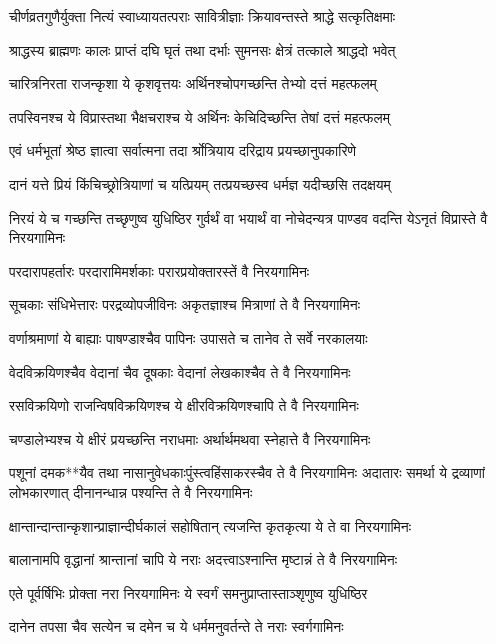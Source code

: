 \twolineshloka
{चीर्णव्रतगुणैर्युक्ता नित्यं स्वाध्यायतत्पराः}
{सावित्रीज्ञाः क्रियावन्तस्ते श्राद्धे सत्कृतिक्षमाः}


\twolineshloka
{श्राद्धस्य ब्राह्मणः कालः प्राप्तं दघि घृतं तथा}
{दर्भाः सुमनसः क्षेत्रं तत्काले श्राद्धदो भवेत्}


\twolineshloka
{चारित्रनिरता राजन्कृशा ये कृशवृत्तयः}
{अर्थिनश्चोपगच्छन्ति तेभ्यो दत्तं महत्फलम्}


\twolineshloka
{तपस्विनश्च ये विप्रास्तथा भैक्षचराश्च ये}
{अर्थिनः केचिदिच्छन्ति तेषां दत्तं महत्फलम्}


\twolineshloka
{एवं धर्मभूतां श्रेष्ठ ज्ञात्वा सर्वात्मना तदा}
{र्श्रोत्रियाय दरिद्राय प्रयच्छानुपकारिणे}


\twolineshloka
{दानं यत्ते प्रियं किंचिच्छ्रोत्रियाणां च यत्प्रियम्}
{तत्प्रयच्छस्व धर्मज्ञ यदीच्छसि तदक्षयम्}


निरयं ये च गच्छन्ति तच्छृणुष्व युधिष्ठिर
\twolineshloka
{गुर्वर्थं वा भयार्थं वा नोचेदन्यत्र पाण्डव}
{वदन्ति येऽनृतं विप्रास्ते वै निरयगामिनः}


\twolineshloka
{परदारापहर्तारः परदारामिमर्शकाः}
{परारप्रयोक्तारस्तें वै निरयगामिनः}


\twolineshloka
{सूचकाः संधिभेत्तारः परद्रव्योपजीविनः}
{अकृतज्ञाश्च मित्राणां ते वै निरयगामिनः}


\twolineshloka
{वर्णाश्रमाणां ये बाह्याः पाषण्डाश्चैव पापिनः}
{उपासते च तानेव ते सर्वे नरकालयाः}


\twolineshloka
{वेदविक्रयिणश्चैव वेदानां चैव दूषकाः}
{वेदानां लेखकाश्चैव ते वै निरयगामिनः}


\twolineshloka
{रसविक्रयिणो राजन्विषविक्रयिणश्च ये}
{क्षीरविक्रयिणश्चापि ते वै निरयगामिनः}


\twolineshloka
{चण्डालेभ्यश्च ये क्षीरं प्रयच्छन्ति नराधमाः}
{अर्थार्थमथवा स्नेहात्ते वै निरयगामिनः}


पशूनां दमक**यैव तथा नासानुवेधकाःपुंस्त्वहिंसाकरस्चैव ते वै निरयगामिनः
\twolineshloka
{अदातारः समर्था ये द्रव्याणां लोभकारणात्}
{दीनानन्धान्न पश्यन्ति ते वै निरयगामिनः}


\twolineshloka
{क्षान्तान्दान्तान्कृशान्प्राज्ञान्दीर्घकालं सहोषितान्}
{त्यजन्ति कृतकृत्या ये ते वा निरयगामिनः}


\twolineshloka
{बालानामपि वृद्धानां श्रान्तानां चापि ये नराः}
{अदत्त्वाऽश्नान्ति मृष्टान्नं ते वै निरयगामिनः}


\twolineshloka
{एते पूर्वर्षिभिः प्रोक्ता नरा निरयगामिनः}
{ये स्वर्गं समनुप्राप्तास्ताञ्शृणुष्व युधिष्ठिर}


\twolineshloka
{दानेन तपसा चैव सत्येन च दमेन च}
{ये धर्ममनुवर्तन्ते ते नराः स्वर्गगामिनः}


